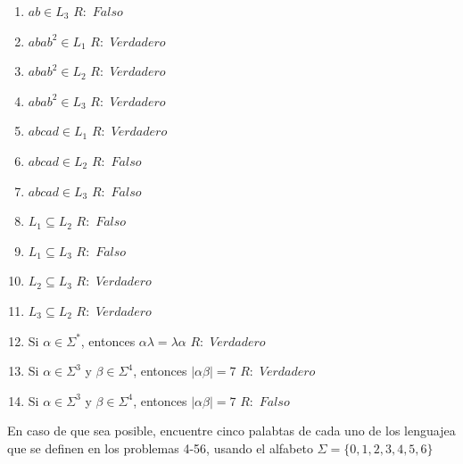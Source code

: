 \begin{enumerate}
    \subitem $R: $ $Falso$
    \item $ab \in L_3$
    \subitem $R: $ $Falso$
    \item $abab^2 \in L_1$
    \subitem $R: $ $Verdadero$
    \item $abab^2 \in L_2$
    \subitem $R: $ $Verdadero$
    \item $abab^2 \in L_3$
    \subitem $R: $ $Verdadero$
    \item $abcad \in L_1$
    \subitem $R: $ $Verdadero$
    \item $abcad \in L_2$
    \subitem $R: $ $Falso$
    \item $abcad \in L_3$
    \subitem $R: $ $Falso$
    \item $L_1 \subseteq L_2$
    \subitem $R: $ $Falso$
    \item $L_1 \subseteq L_3$
    \subitem $R: $ $Falso$
    \item $L_2 \subseteq L_3$
    \subitem $R: $ $Verdadero$
    \item $L_3 \subseteq L_2$
    \subitem $R: $ $Verdadero$
    \item Si $\alpha \in \Sigma^*$, entonces $\alpha\lambda = \lambda\alpha$
    \subitem $R: $ $Verdadero$
    \item Si $\alpha \in \Sigma^3$ y $\beta \in \Sigma^4$, entonces $|\alpha\beta| = 7$
    \subitem $R: $ $Verdadero$
    \item Si $\alpha \in \Sigma^3$ y $\beta \in \Sigma^4$, entonces $|\alpha\beta| = 7$
    \subitem $R: $ $Falso$
\end{enumerate}

En caso de que sea posible, encuentre cinco palabtas de cada uno de los lenguajea que se definen en los problemas 4-56, usando el alfabeto $\Sigma = \{0,1,2,3,4,5,6\}$

